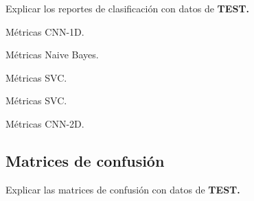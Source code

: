     Explicar los reportes de clasificación con datos de \textbf{TEST.}

    \begin{table}[H]
      \centering
      \caption{Métricas CNN-1D.}
      \label{CNN1DMetrics}
    \end{table}

    \begin{table}[H]
      \centering
      \caption{Métricas Naive Bayes.}
      \label{NBMetrics}
    \end{table}

    \begin{table}[H]
      \centering
      \caption{Métricas SVC.}
      \label{SVCDMetrics}
    \end{table}

    \begin{table}[H]
      \centering
      \caption{Métricas SVC.}
      \label{SVCDMetrics}
    \end{table}

    \begin{table}[H]
      \centering
      \caption{Métricas CNN-2D.}
      \label{CNN2DMetrics}
    \end{table}

  \subsection{Matrices de confusión}

    Explicar las matrices de confusión con datos de \textbf{TEST.}

